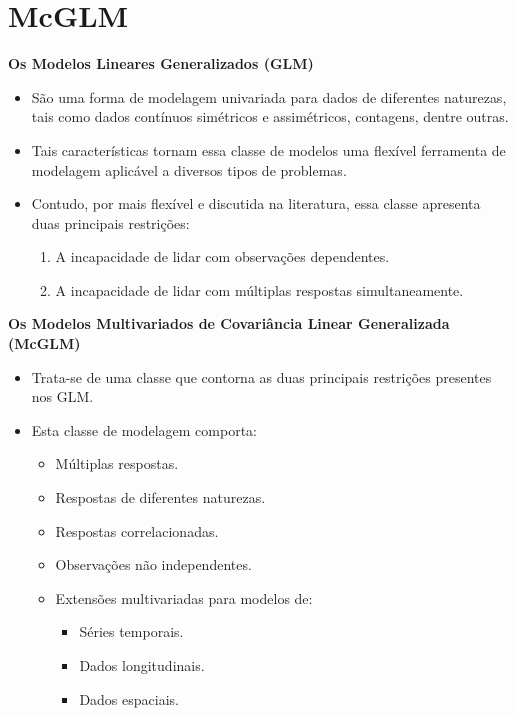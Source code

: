\documentclass[10pt,
  aspectratio=169,
  serif,
  mathserif,
  professionalfont,
  compress,
  handout,
  ]{beamer}\usepackage[]{graphicx}\usepackage[]{color}
\begin{document}
\section{McGLM}

\begin{frame}[c, allowframebreaks]

\textbf{Os Modelos Lineares Generalizados (GLM)}

\begin{itemize}

  \item São uma forma de modelagem univariada para dados de diferentes naturezas, tais como dados contínuos simétricos e assimétricos, contagens, dentre outras. 
  
  \item Tais características tornam essa classe de modelos uma flexível ferramenta de modelagem aplicável a diversos tipos de problemas.

  \item Contudo, por mais flexível e discutida na literatura, essa classe apresenta duas principais restrições: 

  \begin{enumerate}
    \item A incapacidade de lidar com observações dependentes.
    \item A incapacidade de lidar com múltiplas respostas simultaneamente.
  \end{enumerate}
  
\end{itemize}

\end{frame}

\begin{frame}[c, allowframebreaks]

\textbf{Os Modelos Multivariados de Covariância Linear
Generalizada (McGLM)}

\begin{itemize}
  \item Trata-se de uma classe que contorna as duas principais restrições presentes nos GLM.
  
  \item Esta classe de modelagem comporta:

  \begin{itemize}
    \item Múltiplas respostas.
    \item Respostas de diferentes naturezas.
    \item Respostas correlacionadas.
    \item Observações não independentes.
    \item Extensões multivariadas para modelos de:
      \begin{itemize}
        \item Séries temporais.
        \item Dados longitudinais.
        \item Dados espaciais.
    \end{itemize}
  \end{itemize}
\end{itemize}

\end{frame}
\end{document}
